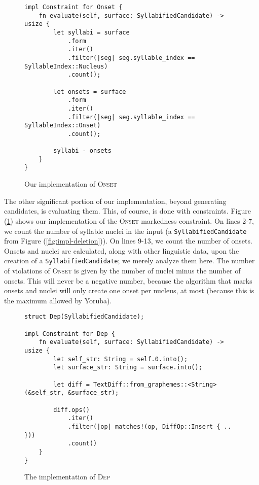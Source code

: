 \documentclass[12pt]{article}
\newcommand{\dep}{\textsc{Dep}}
\newcommand{\onset}{\textsc{Onset}}
\newcommand{\pref}[1]{(\ref{#1})}
\begin{document}
\begin{figure}[h!]
\caption{Our implementation of \onset}
\label{fig:impl-onset}
\begin{verbatim}
impl Constraint for Onset {
    fn evaluate(self, surface: SyllabifiedCandidate) -> usize {
        let syllabi = surface
            .form
            .iter()
            .filter(|seg| seg.syllable_index == SyllableIndex::Nucleus)
            .count();

        let onsets = surface
            .form
            .iter()
            .filter(|seg| seg.syllable_index == SyllableIndex::Onset)
            .count();

        syllabi - onsets
    }
}
\end{verbatim}
\end{figure}

The other significant portion of our implementation, beyond generating
candidates, is evaluating them. This, of course, is done with constraints.
Figure \pref{fig:impl-onset} shows our implementation of the \onset{}
markedness constraint. On lines 2-7, we count the number of syllable
nuclei in the input (a \texttt{SyllabifiedCandidate} from Figure
\pref{fig:impl-deletion}). On lines 9-13, we count the number of onsets.
Onsets and nuclei are calculated, along with other linguistic data, upon
the creation of a \texttt{SyllabifiedCandidate}; we merely analyze them
here. The number of violations of \onset{} is given by the number of
nuclei minus the number of onsets. This will never be a negative number,
because the algorithm that marks onsets and nuclei will only create one
onset per nucleus, at most (because this is the maximum allowed by
Yoruba).

\begin{figure}[h]
\caption{The implementation of \dep}
\label{fig:impl-dep}
\begin{verbatim}
struct Dep(SyllabifiedCandidate);

impl Constraint for Dep {
    fn evaluate(self, surface: SyllabifiedCandidate) -> usize {
        let self_str: String = self.0.into();
        let surface_str: String = surface.into();

        let diff = TextDiff::from_graphemes::<String>(&self_str, &surface_str);

        diff.ops()
            .iter()
            .filter(|op| matches!(op, DiffOp::Insert { .. }))
            .count()
    }
}
\end{verbatim}
\end{figure}
\end{document}
